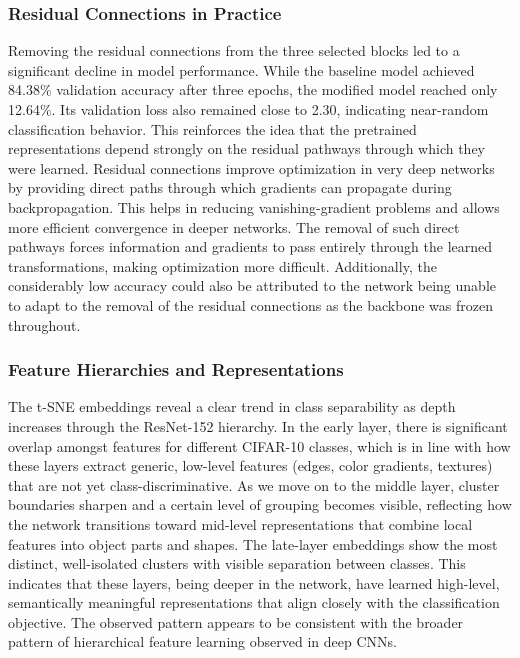 \documentclass{article}
\begin{document}
\subsubsection{Residual Connections in Practice}
Removing the residual connections from the three selected blocks led to a significant decline in model performance. While the baseline model achieved 84.38\% validation accuracy after three epochs, the modified model reached only 12.64\%. Its validation loss also remained close to 2.30, indicating near-random classification behavior.  This reinforces the idea that the pretrained representations depend strongly on the residual pathways through which they were learned.  Residual connections improve optimization in very deep networks by providing direct paths through which gradients can propagate during backpropagation. This helps in reducing vanishing-gradient problems and allows more efficient convergence in deeper networks. The removal of such direct pathways forces information and gradients to pass entirely through the learned transformations, making optimization more difficult. Additionally, the considerably low accuracy could also be attributed to the network being unable to adapt to the removal of the residual connections as the backbone was frozen throughout.

\subsubsection{Feature Hierarchies and Representations}
The t-SNE embeddings reveal a clear trend in class separability as depth increases through the ResNet-152 hierarchy. In the early layer, there is significant overlap amongst features for different CIFAR-10 classes, which is in line with how these layers extract generic, low-level features (edges, color gradients, textures) that are not yet class-discriminative. As we move on to the middle layer, cluster boundaries sharpen and a certain level of grouping becomes visible, reflecting how the network transitions toward mid-level representations that combine local features into object parts and shapes. The late-layer embeddings show the most distinct, well-isolated clusters with visible separation between classes. This indicates that these layers, being deeper in the network, have learned high-level, semantically meaningful representations that align closely with the classification objective. The observed pattern appears to be consistent with the broader pattern of hierarchical feature learning observed in deep CNNs.
\end{document}
